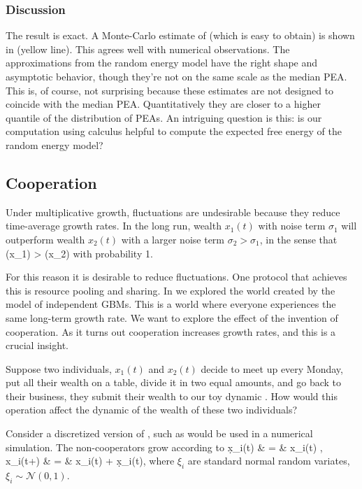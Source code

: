 \subsubsection{Discussion}
The \Ito result is exact. A Monte-Carlo estimate of  (which is easy to obtain) is 
shown in  (yellow line). This agrees well with numerical observations.
The approximations from the random energy model have the right shape and asymptotic behavior, 
though they're not on the same scale as the median PEA. This is, of course, not surprising because
these estimates are not designed to coincide with the median PEA. Quantitatively they are closer to 
a higher quantile of the distribution of PEAs. An intriguing question is this: is our computation 
using \Ito calculus helpful to compute the expected free energy of the random energy model? 

\subsection{Cooperation}
Under multiplicative growth, fluctuations are undesirable because they reduce 
time-average growth rates. In the long run, wealth $x_1(t)$ with noise term 
$\sigma_1$ will outperform wealth $x_2(t)$ with a larger 
noise term $\sigma_2>\sigma_1$, in the sense that 
\be
\gt(x_1) > \gt(x_2)
\ee
with probability 1.

For this reason it is desirable to reduce fluctuations. One protocol that achieves this is 
resource pooling and sharing. In  we explored the world created 
by the model of independent GBMs. This is a world where everyone experiences the 
same long-term growth rate. We want to explore the effect of the invention of 
cooperation. As it turns out cooperation increases growth rates, and this is a 
crucial insight. 

Suppose two individuals, $x_1(t)$ and $x_2(t)$ decide to meet up every Monday, put all 
their wealth on a table, divide it in two equal amounts, and go back to their business, \ie
they submit their wealth to our toy dynamic . How 
would this operation affect the dynamic of the wealth of these two individuals?

 Consider a discretized version of , such as would be used in a numerical simulation. The non-cooperators grow according to
 \bea
 \d x_i(t) & = & x_i(t) ,  \\
 x_i(t+\dt) & = & x_i(t) + \d x_i(t), 
 \eea
 where $\xi_i$ are standard normal random variates, $\xi_i\sim \mathcal{N}(0,1)$.


